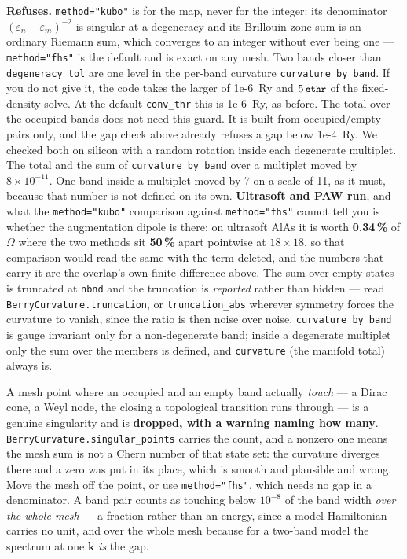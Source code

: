 \documentclass[11pt,a4paper]{article}
\newcommand{\code}[1]{\texttt{\small #1}}
\begin{document}
\begin{refuses}
\textbf{Refuses.} \code{method="kubo"} is for the map, never for the integer:
its denominator $(\varepsilon_n-\varepsilon_m)^{-2}$ is singular at a degeneracy
and its Brillouin-zone sum is an ordinary Riemann sum, which converges to an
integer without ever being one --- \code{method="fhs"} is the default and is
exact on any mesh. Two bands closer than \code{degeneracy\_tol} are one level
in the per-band curvature \code{curvature\_by\_band}. If you do not give it, the
code takes the larger of 1e-6~Ry and $5\,\code{ethr}$ of the fixed-density solve.
At the default \code{conv\_thr} this is 1e-6~Ry, as before. The total over the
occupied bands does not need this guard. It is built from occupied/empty pairs
only, and the gap check above already refuses a gap below 1e-4~Ry. We checked
both on silicon with a random rotation inside each degenerate multiplet. The
total and the sum of \code{curvature\_by\_band} over a multiplet moved by
$8\times10^{-11}$. One band inside a multiplet moved by 7 on a scale of 11, as
it must, because that number is not defined on its own. \textbf{Ultrasoft and PAW run}, and what the
\code{method="kubo"} comparison against \code{method="fhs"} cannot tell you is
whether the augmentation dipole is there: on ultrasoft AlAs it is worth
\textbf{0.34\,\%} of $\Omega$ where the two methods sit \textbf{50\,\%} apart
pointwise at $18\times18$, so that comparison would read the same with the term
deleted, and the numbers that carry it are the overlap's own finite difference
above. The sum over empty states is
truncated at \code{nbnd} and the truncation is \emph{reported} rather than
hidden --- read \code{BerryCurvature.truncation}, or \code{truncation\_abs}
wherever symmetry forces the curvature to vanish, since the ratio is then noise
over noise. \code{curvature\_by\_band} is gauge invariant only for a
non-degenerate band; inside a degenerate multiplet only the sum over the members
is defined, and \code{curvature} (the manifold total) always is.

A mesh point where an occupied and an empty band actually \emph{touch} --- a
Dirac cone, a Weyl node, the closing a topological transition runs through ---
is a genuine singularity and is \textbf{dropped, with a warning naming how
many}. \code{BerryCurvature.singular\_points} carries the count, and a nonzero
one means the mesh sum is not a Chern number of that state set: the curvature
diverges there and a zero was put in its place, which is smooth and plausible
and wrong. Move the mesh off the point, or use \code{method="fhs"}, which
needs no gap in a denominator. A band pair counts as touching below
$10^{-8}$ of the band width \emph{over the whole mesh} --- a fraction rather
than an energy, since a model Hamiltonian carries no unit, and over the whole
mesh because for a two-band model the spectrum at one $\mathbf k$ \emph{is}
the gap.
\end{refuses}
\end{document}
